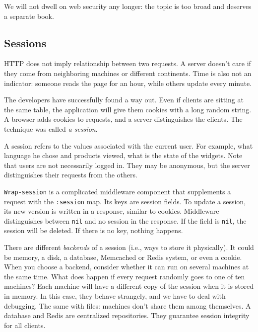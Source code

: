 We will not dwell on web security any longer: the topic is too broad and deserves a separate book.

\subsection{Sessions}


HTTP does not imply relationship between two requests. A server doesn't care if they come from neighboring machines or different continents. Time is also not an indicator: someone reads the page for an hour, while others update every minute.

The developers have successfully found a way out. Even if clients are sitting at the same table, the application will give them cookies with a long random string. A browser adds cookies to requests, and a server distinguishes the clients. The technique was called \emph{a session}.

A session refers to the values associated with the current user. For example, what language he chose and products viewed, what is the state of the widgets. Note that users are not necessarily logged in. They may be anonymous, but the server distinguishes their requests from the others.


\verb|Wrap-session| is a complicated middleware component that supplements a request with the \verb|:session| map. Its keys are session fields. To update a session, its new version is written in a response, similar to cookies. Middleware distinguishes between \verb|nil| and no session in the response. If the field is \verb|nil|, the session will be deleted. If there is no key, nothing happens.


There are different \emph{backends} of a session (i.e., ways to store it physically). It could be memory, a disk, a database, Memcached or Redis system, or even a cookie. When you choose a backend, consider whether it can run on several machines at the same time. What does happen if every request randomly goes to one of ten machines? Each machine will have a different copy of the session when it is stored in memory. In this case, they behave strangely, and we have to deal with debugging. The same with files: machines don't share them among themselves. A database and Redis are centralized repositories. They guarantee session integrity for all clients.

